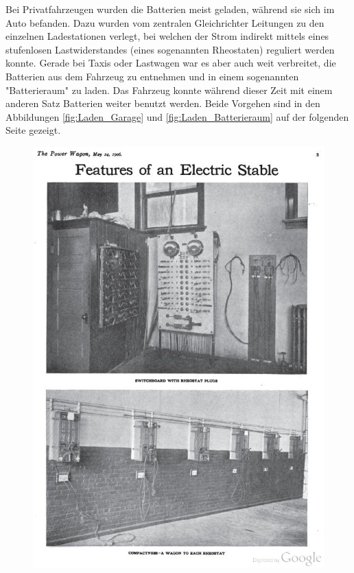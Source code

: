 Bei Privatfahrzeugen wurden die Batterien meist geladen, während sie sich im Auto befanden. Dazu wurden vom zentralen Gleichrichter Leitungen zu den einzelnen Ladestationen verlegt, bei welchen der Strom indirekt mittels eines stufenlosen Lastwiderstandes (eines sogenannten Rheostaten) reguliert werden konnte. Gerade bei Taxis oder Lastwagen war es aber auch weit verbreitet, die Batterien aus dem Fahrzeug zu entnehmen und in einem sogenannten "Batterieraum" zu laden. Das Fahrzeug konnte während dieser Zeit mit einem anderen Satz Batterien weiter benutzt werden. Beide Vorgehen sind in den Abbildungen \ref{fig:Laden_Garage} und \ref{fig:Laden_Batterieraum} auf der folgenden Seite gezeigt.

\begin{landscape}
\begin{figure}
\begin{minipage}{0.65\textwidth}
	\includegraphics[width=\textwidth]{images/Laden_Garage.jpg}

\end{minipage}
\end{figure}
\end{landscape}
